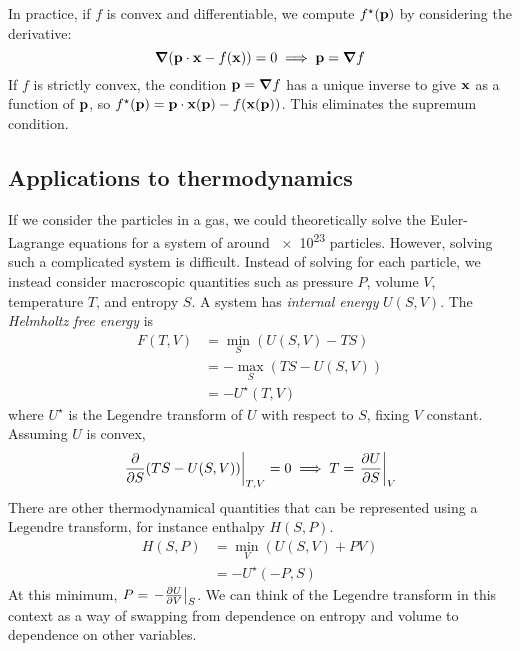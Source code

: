 In practice, if \( f \) is convex and differentiable, we compute \( f^\star(\vb p) \) by considering the derivative:
\[
	\grad(\vb p \cdot \vb x - f(\vb x)) = 0 \implies \vb p = \grad{f}
\]
If \( f \) is strictly convex, the condition \( \vb p = \grad{f} \) has a unique inverse to give \( \vb x \) as a function of \( \vb p \), so \( f^\star(\vb p) = \vb p \cdot \vb x(\vb p) - f(\vb x(\vb p)) \).
This eliminates the supremum condition.

\subsection{Applications to thermodynamics}
If we consider the particles in a gas, we could theoretically solve the Euler-Lagrange equations for a system of around \num{e23} particles.
However, solving such a complicated system is difficult.
Instead of solving for each particle, we instead consider macroscopic quantities such as pressure \( P \), volume \( V \), temperature \( T \), and entropy \( S \).
A system has \textit{internal energy} \( U(S, V) \).
The \textit{Helmholtz free energy} is
\begin{align*}
	F(T, V) & = \min_S (U(S, V) - TS)   \\
	        & = - \max_S (TS - U(S, V)) \\
	        & = -U^\star(T, V)
\end{align*}
where \( U^\star \) is the Legendre transform of \( U \) with respect to \( S \), fixing \( V \) constant.
Assuming \( U \) is convex,
\[
	\eval{\pdv{S} \qty(TS - U(S,V))}_{T,V} = 0 \implies T = \eval{\pdv{U}{S}}_{V}
\]
There are other thermodynamical quantities that can be represented using a Legendre transform, for instance enthalpy \( H(S, P) \).
\begin{align*}
	H(S, P) & = \min_V (U(S,V) + PV) \\
	        & = - U^\star(-P, S)
\end{align*}
At this minimum, \( P = \eval{-\pdv{U}{V}}_S \).
We can think of the Legendre transform in this context as a way of swapping from dependence on entropy and volume to dependence on other variables.

